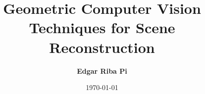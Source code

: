 %
%
%



\title{Geometric Computer Vision Techniques for Scene Reconstruction}
\author{\textbf{Edgar Riba Pi}}
\date{\today}



\frontmatter
%


\setcounter{page}{0}




\tableofcontents
\cleardoublepage
{}
{} %
\listoffigures
\cleardoublepage
{}
{} %
\listoftables


\setlength{\parskip}{0em}


\mainmatter






%
\backmatter




